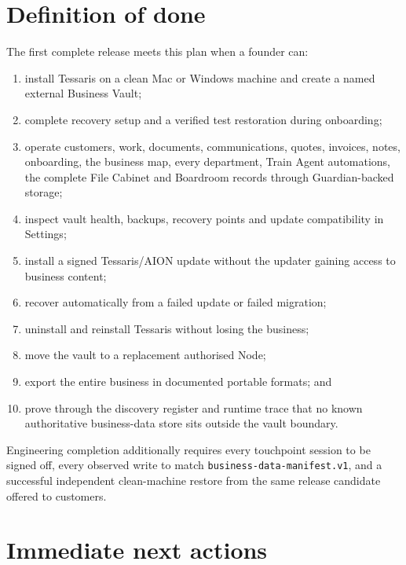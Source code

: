 \documentclass[11pt]{article}
\newcommand{\code}[1]{\texttt{#1}}
\begin{document}
\section{Definition of done}

The first complete release meets this plan when a founder can:

\begin{enumerate}
  \item install Tessaris on a clean Mac or Windows machine and create a named external Business Vault;
  \item complete recovery setup and a verified test restoration during onboarding;
  \item operate customers, work, documents, communications, quotes, invoices, notes, onboarding, the business map, every department, Train Agent automations, the complete File Cabinet and Boardroom records through Guardian-backed storage;
  \item inspect vault health, backups, recovery points and update compatibility in Settings;
  \item install a signed Tessaris/AION update without the updater gaining access to business content;
  \item recover automatically from a failed update or failed migration;
  \item uninstall and reinstall Tessaris without losing the business;
  \item move the vault to a replacement authorised Node;
  \item export the entire business in documented portable formats; and
  \item prove through the discovery register and runtime trace that no known authoritative business-data store sits outside the vault boundary.
\end{enumerate}

Engineering completion additionally requires every touchpoint session to be signed off, every observed write to match \code{business-data-manifest.v1}, and a successful independent clean-machine restore from the same release candidate offered to customers.

\section{Immediate next actions}
\end{document}
